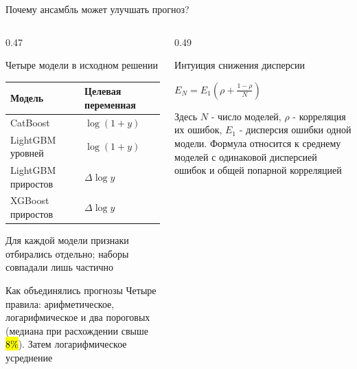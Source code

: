 \begin{frame}[t]{Почему ансамбль может улучшать прогноз?}
  \VladimirText
  \par
  
  \begin{columns}[T,onlytextwidth]
    \begin{column}{0.47\textwidth}
      \begin{block}{Четыре модели в исходном решении}
        \VladimirText
        \setlength{\tabcolsep}{4pt}
        \renewcommand{\arraystretch}{.95}
        \begin{tabular}{@{}ll@{}}
          \toprule
          \textbf{Модель} & \textbf{Целевая переменная} \\
          \midrule
          CatBoost & $\log(1+y)$ \\
          LightGBM уровней & $\log(1+y)$ \\
          LightGBM приростов & $\Delta\log y$ \\
          XGBoost приростов & $\Delta\log y$ \\
          \bottomrule
        \end{tabular}
      \end{block}
      
      {\VladimirText Для каждой модели признаки отбирались отдельно; наборы совпадали лишь частично}\par
      
      \begin{block}{Как объединялись прогнозы}
        \VladimirText Четыре правила: арифметическое, логарифмическое и два пороговых (медиана при расхождении свыше \hl{8\%}). Затем логарифмическое усреднение
      \end{block}
    \end{column}
    \begin{column}{0.49\textwidth}
      \begin{block}{Интуиция снижения дисперсии}
        
        \begin{center}
          {\large\color{hsedark}\(
            E_N=E_1\left(\rho+\frac{1-\rho}{N}\right)
          \)}
        \end{center}
        
        \VladimirText Здесь $N$ - число моделей, $\rho$ - корреляция их ошибок, $E_1$ - дисперсия ошибки одной модели. Формула относится к среднему моделей с одинаковой дисперсией ошибок и общей попарной корреляцией
      \end{block}
      

\end{column}
\end{columns}
\end{frame}
